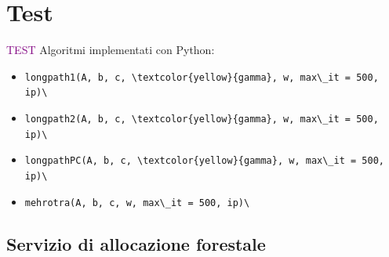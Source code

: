 \section{Test}
\begin{frame}{\textcolor{purple}{TEST}}
	Algoritmi implementati con Python:
	\begin{itemize}
	\item \verb!longpath1(A, b, c, \textcolor{yellow}{gamma}, w, max\_it = 500, ip)\!
	\item \verb!longpath2(A, b, c, \textcolor{yellow}{gamma}, w, max\_it = 500, ip)\!
	\item \verb!longpathPC(A, b, c, \textcolor{yellow}{gamma}, w, max\_it = 500, ip)\!
	\item \verb!mehrotra(A, b, c, w, max\_it = 500, ip)\!
	\end{itemize}
\end{frame}
\subsection{Servizio di allocazione forestale}


